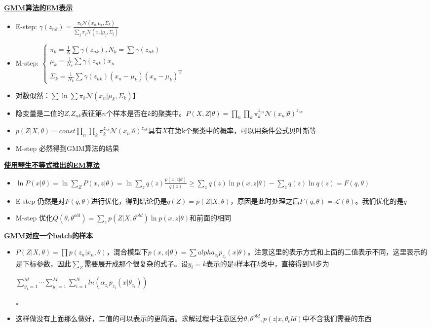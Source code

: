 \documentclass[UTF8,a4paper,landscape,compress]{paper}
\renewcommand{\subsection}[1]{{\small\textbf{\underline{#1}}}\\ }
\newcommand{\List}[1]{\begin{itemize}[fullwidth,itemindent=0em] #1 \end{itemize}}
\begin{document}
\begin{multicols}{4}
\subsection{GMM算法的EM表示}
\List{
    \item {E-step: $\gamma(z_{nk}) = \frac{\pi_k\mathcal N(x_n|\mu_k,\Sigma_k)}{\sum_j \pi_j\mathcal N(x_n|\mu_j,\Sigma_j)}$}
    \item {M-step: $\begin{cases}\pi_k = \frac1{N}\sum\gamma(z_{nk}), N_k = \sum\gamma(z_{nk})\\ \mu_k = \frac1{N_k}\sum\gamma(z_{nk})x_n\\ \Sigma_k = \frac1{N_k}\sum\gamma(z_{nk})(x_n - \mu_k)(x_n - \mu_k)^{\mathrm T}\end{cases}$}
    \item {对数似然：$\sum\ln\sum\pi_k\mathcal N(x_n|\mu_k,\Sigma_k)$}】
    \item {隐变量是二值的$Z$,$Z_{nk}$表征第$n$个样本是否在$k$的聚类中。$P(X,Z|\theta) = \prod_n\prod_k\pi_k^{z_{nk}}\mathcal N(x_n|\theta)^{z_{nk}}$}
    \item {$p(Z|X,\theta) = const \prod_n\prod_k\pi_k^{z_{nk}}\mathcal N(x_n|\theta)^{z_{nk}}$具有$X$在第k个聚类中的概率，可以用条件公式贝叶斯等}
    \item {M-step 必然得到GMM算法的结果}
}
\subsection{使用琴生不等式推出的EM算法}
\List{
    \item {$\ln P(x|\theta) = \ln\sum_Z P(x,z|\theta) = \ln\sum_zq(z)\frac{p(x,z|\theta)}{q(z)} \ge \sum_zq(z)\ln p(x,z|\theta) - \sum_zq(z)\ln q(z) = F(q,\theta)$}
    \item {E-step 仍然是对$F(q,\theta)$进行优化，得到结论仍是$q(Z) = p(Z|X,\theta)$，原因是此时处理之后$F(q,\theta) = \mathcal L(\theta)$。我们优化的是$q$}
    \item {M-step 优化$Q(\theta,\theta^{old}) = \sum_zp(Z|X,\theta^{old})\ln p(x,z|\theta)$和前面的相同}
}
\subsection{GMM对应一个batch的样本}
\List{
    \item {$P(Z|X,\theta) = \prod p(z_n|x_n,\theta)$，混合模型下$p(x,z|\theta) = \sum alpha_{z_i}p_{z_i}(x|\theta)$。注意这里的表示方式和上面的二值表示不同，这里表示的是下标参数，因此$\sum_Z$需要展开成那个很复杂的式子。设$y_i = k$表示的是$i$样本在$k$类中，直接得到M步为
    
    $\sum_{y_1 = 1}^M \cdots\sum_{y_1 = 1}^M\sum_{i=1}^Nln(\alpha_{z_i}p_{z_i}(x|\theta_{z_i}))$}。
    \item {这样做没有上面那么做好，二值的可以表示的更简洁。求解过程中注意区分$\theta,\theta^{old},p(z|x,\theta_old)$中不含我们需要的东西}
}
\clearpage
\end{multicols}
\end{document}
